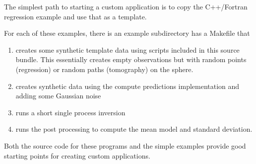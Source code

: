 \documentclass[a4paper,12pt]{article}
\begin{document}
The simplest path to starting a custom application is to copy 
the C++/Fortran regression example and use that as
a template.

For each of these examples, there is an example subdirectory
has a Makefile that

\begin{enumerate}
\item creates some synthetic template data using scripts included in this source
  bundle. This essentially creates empty observations but with random points (regression) or
  random paths (tomography) on the sphere.
\item creates synthetic data using the compute predictions implementation and adding
  some Gaussian noise
\item runs a short single process inversion
\item runs the post processing to compute the mean model and standard deviation.
\end{enumerate}

Both the source code for these programs and the simple examples provide good
starting points for creating custom applications.




\end{document}
